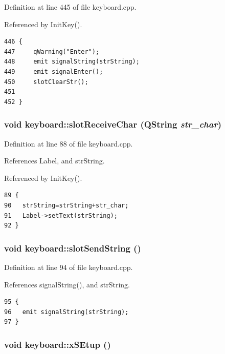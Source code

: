 Definition at line 445 of file keyboard.cpp.

Referenced by Init\-Key().



\footnotesize\begin{verbatim}446 {
447     qWarning("Enter");
448     emit signalString(strString);
449     emit signalEnter();
450     slotClearStr();
451     
452 }
\end{verbatim}\normalsize 
{}
\subsubsection{\setlength{\rightskip}{0pt plus 5cm}void keyboard::slot\-Receive\-Char (QString {\em str\_\-char})\hspace{0.3cm}{\tt  [slot]}}\label{classkeyboard_keyboardi0}




Definition at line 88 of file keyboard.cpp.

References Label, and str\-String.

Referenced by Init\-Key().



\footnotesize\begin{verbatim}89 {
90   strString=strString+str_char;
91   Label->setText(strString);
92 }
\end{verbatim}\normalsize 
{}
\subsubsection{\setlength{\rightskip}{0pt plus 5cm}void keyboard::slot\-Send\-String ()\hspace{0.3cm}{\tt  [slot]}}\label{classkeyboard_keyboardi1}




Definition at line 94 of file keyboard.cpp.

References signal\-String(), and str\-String.



\footnotesize\begin{verbatim}95 {
96   emit signalString(strString);
97 }
\end{verbatim}\normalsize 
{}
\subsubsection{\setlength{\rightskip}{0pt plus 5cm}void keyboard::x\-SEtup ()}\label{classkeyboard_keyboarda2}




